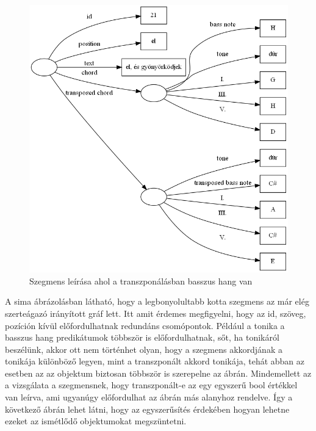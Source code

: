 \begin{figure}[h]
	\includegraphics[scale=0.5]{images/img_src/rdf_graph_6.png}
	\caption{Szegmens leírása ahol a transzponálásban basszus hang van}
	\label{fig:graph6}
\end{figure}

A sima ábrázolásban látható, hogy a legbonyolultabb kotta szegmens az már elég szerteágazó irányított gráf lett. Itt amit érdemes megfigyelni, hogy az id, szöveg, pozíción kívül előfordulhatnak redundáns csomópontok. Például a tonika a basszus hang predikátumok többször is előfordulhatnak, sőt, ha tonikáról beszélünk, akkor ott nem történhet olyan, hogy a szegmens akkordjának a tonikája különböző legyen, mint a transzponált akkord tonikája, tehát abban az esetben az az objektum biztosan többször is szerepelne az ábrán. Mindemellett az a vizsgálata a szegmensnek, hogy transzponált-e az egy egyszerű bool értékkel van leírva, ami ugyanúgy előfordulhat az ábrán más alanyhoz rendelve. Így a következő ábrán lehet látni, hogy az egyszerűsítés érdekében hogyan lehetne ezeket az ismétlődő objektumokat megszüntetni.

